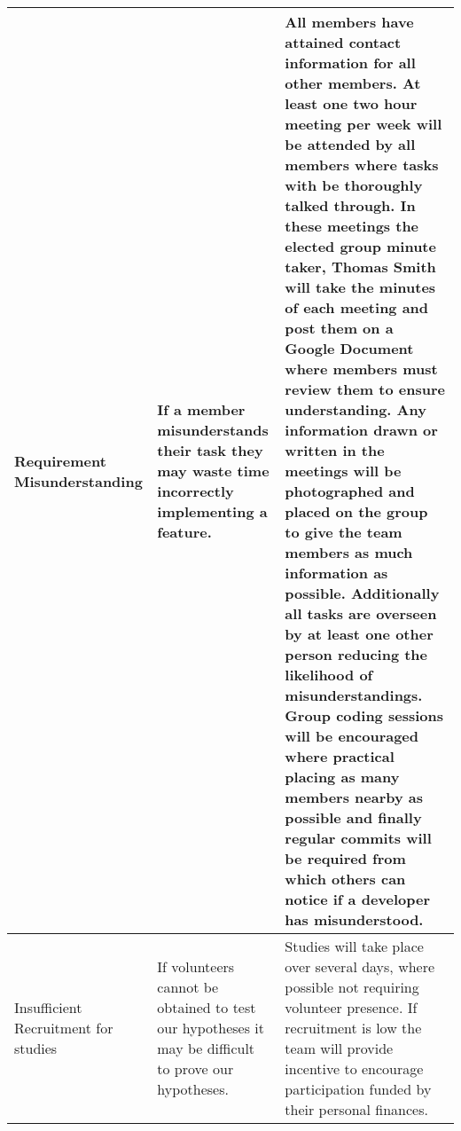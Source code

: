 \begin{center}
\begin{landscape}
\begin{longtable}{>{\raggedright}p{3cm}  >{\raggedright}p{7cm}  p{12cm}}
        Requirement Misunderstanding                    & If a member misunderstands their task they may waste time incorrectly implementing a feature.                                                                                                                                                                                                                                                                                & All members have attained contact information for all other members. At least one two hour meeting per week will be attended by all members where tasks with be thoroughly talked through. In these meetings the elected group minute taker, Thomas Smith will take the minutes of each meeting and post them on a Google Document where members must review them to ensure understanding. Any information drawn or written in the meetings will be photographed and placed on the group to give the team members as much information as possible. Additionally all tasks are overseen by at least one other person reducing the likelihood of misunderstandings. Group coding sessions will be encouraged where practical placing as many members nearby as possible and finally regular commits will be required from which others can notice if a developer has misunderstood.                                                                                                                                                         \\ \midrule
        Insufficient Recruitment for studies             & If volunteers cannot be obtained to test our hypotheses it may be difficult to prove our hypotheses.                                                                                                                                                                                                                                                                         & Studies will take place over several days, where possible not requiring volunteer presence. If recruitment is low the team will provide incentive to encourage participation funded by their personal finances.                                                                                                                                                                                                                                                                                                                                                                                                                                                                                                                                                                                                                                                                                                                                                                                                                          \\ \midrule

\end{longtable}
\end{landscape}
\end{center}

